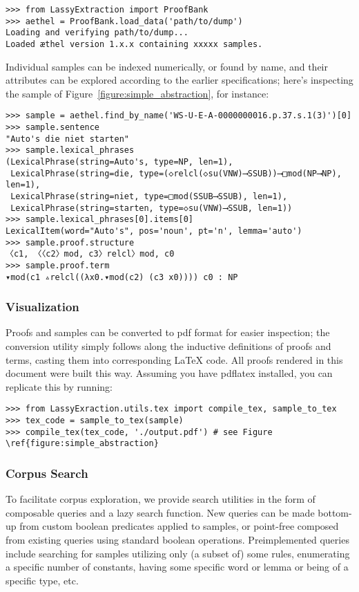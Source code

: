 \begin{verbatim}
>>> from LassyExtraction import ProofBank
>>> aethel = ProofBank.load_data('path/to/dump')
Loading and verifying path/to/dump...
Loaded æthel version 1.x.x containing xxxxx samples.
\end{verbatim}

\noindent Individual samples can be indexed numerically, or found by name, and their attributes can be explored according to the earlier specifications; here's inspecting the sample of Figure~\ref{figure:simple_abstraction}, for instance:

\begin{verbatim}
>>> sample = aethel.find_by_name('WS-U-E-A-0000000016.p.37.s.1(3)')[0]
>>> sample.sentence
"Auto's die niet starten"
>>> sample.lexical_phrases
(LexicalPhrase(string=Auto's, type=NP, len=1),
 LexicalPhrase(string=die, type=(◇relcl(◇su(VNW)⟶SSUB))⟶□mod(NP⟶NP), len=1),
 LexicalPhrase(string=niet, type=□mod(SSUB⟶SSUB), len=1),
 LexicalPhrase(string=starten, type=◇su(VNW)⟶SSUB, len=1))
>>> sample.lexical_phrases[0].items[0]
LexicalItem(word="Auto's", pos='noun', pt='n', lemma='auto')
>>> sample.proof.structure
〈c1, 〈〈c2〉mod, c3〉relcl〉mod, c0
>>> sample.proof.term
▾mod(c1 ▵relcl((λx0.▾mod(c2) (c3 x0)))) c0 : NP
\end{verbatim}

\subsubsection{Visualization}
Proofs and samples can be converted to pdf format for easier inspection; the conversion utility simply follows along the inductive definitions of proofs and terms, casting them into corresponding \LaTeX{} code.
All proofs rendered in this document were built this way.
Assuming you have pdflatex installed, you can replicate this by running:
\begin{verbatim}
>>> from LassyExraction.utils.tex import compile_tex, sample_to_tex
>>> tex_code = sample_to_tex(sample)
>>> compile_tex(tex_code, './output.pdf') # see Figure \ref{figure:simple_abstraction}
\end{verbatim}

\subsubsection{Corpus Search}
To facilitate corpus exploration, we provide search utilities in the form of composable queries and a lazy search function.
New queries can be made bottom-up from custom boolean predicates applied to samples, or point-free composed from existing queries using standard boolean operations.
Preimplemented queries include searching for samples utilizing only (a subset of) some rules, enumerating a specific number of constants, having some specific word or lemma or being of a specific type, etc.

